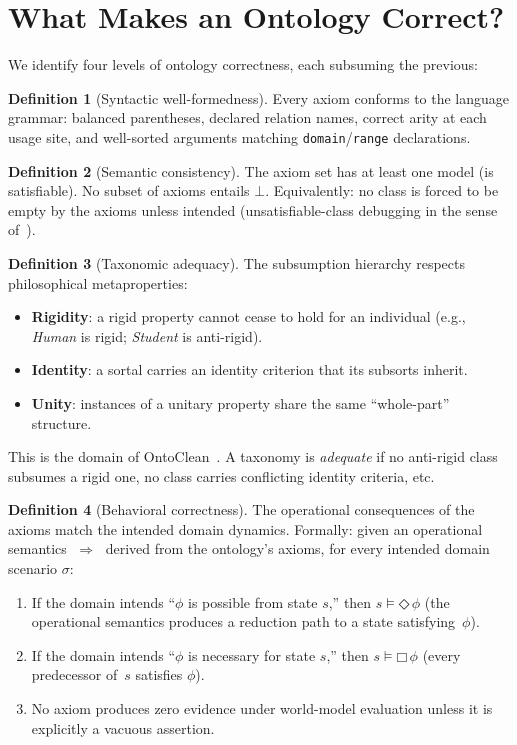 \documentclass[11pt]{article}
\newcommand{\DiamondOp}{\mathbin{\Diamond}}
\newcommand{\BoxOp}{\mathbin{\Box}}
\newcommand{\Red}{\;\Rightarrow\;}
\theoremstyle{definition}
\newtheorem{definition}{Definition}[section]
\theoremstyle{plain}
\begin{document}
\section{What Makes an Ontology Correct?}
\label{sec:correctness}

We identify four levels of ontology correctness, each subsuming the
previous:

\begin{definition}[Syntactic well-formedness]
Every axiom conforms to the language grammar: balanced parentheses,
declared relation names, correct arity at each usage site, and
well-sorted arguments matching \texttt{domain}/\texttt{range}
declarations.
\end{definition}

\begin{definition}[Semantic consistency]
The axiom set has at least one model (is satisfiable).
No subset of axioms entails $\bot$.
Equivalently: no class is forced to be empty by the axioms unless
intended (unsatisfiable-class debugging in the sense
of~\cite{kalyanpur2005}).
\end{definition}

\begin{definition}[Taxonomic adequacy]
The subsumption hierarchy respects philosophical metaproperties:
\begin{itemize}[nosep]
  \item \textbf{Rigidity}: a rigid property cannot cease to hold for
    an individual (e.g., \textit{Human} is rigid; \textit{Student}
    is anti-rigid).
  \item \textbf{Identity}: a sortal carries an identity criterion
    that its subsorts inherit.
  \item \textbf{Unity}: instances of a unitary property share the
    same ``whole-part'' structure.
\end{itemize}
This is the domain of OntoClean~\cite{guarino-welty-ontoclean}.
A taxonomy is \emph{adequate} if no anti-rigid class subsumes a rigid
one, no class carries conflicting identity criteria, etc.
\end{definition}

\begin{definition}[Behavioral correctness]
\label{def:behavioral}
The operational consequences of the axioms match the intended domain
dynamics.
Formally: given an operational semantics $\Red$ derived from the
ontology's axioms, for every intended domain scenario $\sigma$:
\begin{enumerate}[nosep]
  \item If the domain intends ``$\phi$ is possible from state $s$,''
    then $s \models \DiamondOp\,\phi$ (the operational semantics
    produces a reduction path to a state satisfying~$\phi$).
  \item If the domain intends ``$\phi$ is necessary for state $s$,''
    then $s \models \BoxOp\,\phi$ (every predecessor of~$s$ satisfies
    $\phi$).
  \item No axiom produces zero evidence under world-model evaluation
    unless it is explicitly a vacuous assertion.
\end{enumerate}
\end{definition}
\end{document}
